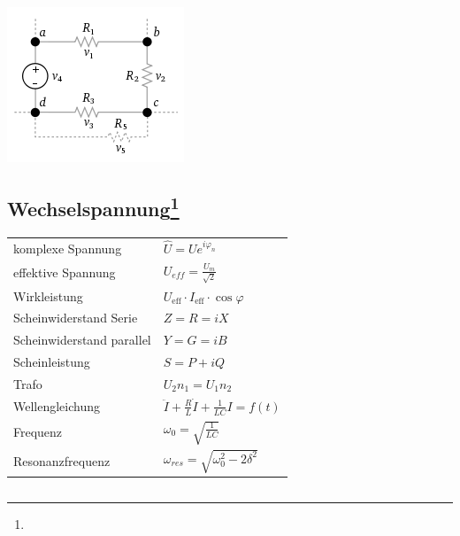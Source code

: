 \documentclass[12pt,a4paper]{article}
\renewcommand{\=}[1]{\stackrel{#1}{=}}
\theoremstyle{definition}
\theoremstyle{remark}
\begin{document}
\begin{center}
\begin{minipage}[t]{.5\linewidth}
\includegraphics[width=\linewidth]{pic/maschenregel.png}
\end{minipage}
\end{center}
\newpage

\subsection[Wechselspannung]{Wechselspannung\let\thefootnote\relax\footnote{}}

\begin{center}
\begin{minipage}[t]{.5\linewidth}
\vspace{0pt}
\noindent\begin{tabular}{ll}
komplexe Spannung & $\hat U = U e^{i \varphi_n}$\\
effektive Spannung & $U_{eff} = \frac{U_m}{\sqrt{2}}$\\
Wirkleistung & $U_{\text{eff}} \cdot I_{\text{eff}} \cdot \cos \varphi$\\
Scheinwiderstand Serie & $Z = R = i X$\\
Scheinwiderstand parallel & $Y = G = i B$\\
Scheinleistung & $S = P + i Q$\\
Trafo & $U_2 n_1 = U_1 n_2$\\
Wellengleichung & $\ddot{I} + \frac{R}{L} \dot{I} + \frac{1}{LC} I = f(t)$\\
Frequenz & $\omega_0 = \sqrt{\frac{1}{LC}}$\\
Resonanzfrequenz & $\omega_{res} = \sqrt{\omega_0^2 - 2\delta^2}$\\
\end{tabular}
\end{minipage}%
\begin{minipage}[t]{.5\linewidth}
\vspace{0pt}
\noindent\begin{tabular}{ll}

\end{tabular}
\end{minipage}
\end{center}
\end{document}
